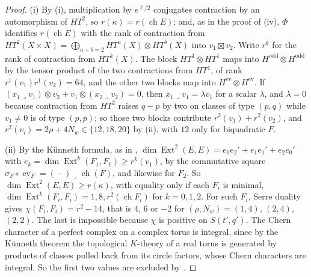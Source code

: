 \documentclass[11pt,reqno]{amsart}
\theoremstyle{plain}
\theoremstyle{definition}
\theoremstyle{remark}
\DeclareMathOperator{\ch}{ch}
\DeclareMathOperator{\Ext}{Ext}
\begin{document}
\begin{proof}
(i) By (i), multiplication by $e^{\ell/2}$ conjugates
contraction by an automorphism of $HT^{2}$, so $r(\kappa)=r(\ch E)$; and, as
in the proof of (iv), $\Phi$ identifies $r(\ch E)$ with the
rank of contraction from $HT^{2}(X\times X)=\bigoplus_{a+b=2}HT^{a}(X)\otimes
HT^{b}(X)$ into $v_{1}\boxtimes v_{2}$. Write $r^{k}$ for the rank of
contraction from $HT^{k}(X)$. The block $HT^{1}\otimes HT^{1}$ maps into
$H^{\mathrm{odd}}\otimes H^{\mathrm{odd}}$ by the tensor product of the two
contractions from $HT^{1}$, of rank $r^{1}(v_{1})r^{1}(v_{2})=64$, and the other
two blocks map into $H^{\mathrm{ev}}\otimes H^{\mathrm{ev}}$. If
$(x_{1}\lrcorner v_{1})\otimes v_{2}+v_{1}\otimes(x_{2}\lrcorner v_{2})=0$, then
$x_{1}\lrcorner v_{1}=\lambda v_{1}$ for a scalar $\lambda$, and $\lambda=0$
because contraction from $HT^{2}$ raises $q-p$ by two on classes of type
$(p,q)$ while $v_{1}\ne0$ is of type $(p,p)$; so those two blocks contribute
$r^{2}(v_{1})+r^{2}(v_{2})$, and $r^{2}(v_{i})=2\rho+4N_{w}\in\{12,18,20\}$ by
(ii), with $12$ only for biquadratic $F$.

(ii) By the K\"unneth formula, as in ,
$\dim\Ext^{2}(E,E)=e_{0}e_{2}'+e_{1}e_{1}'+e_{2}e_{0}'$ with
$e_{k}=\dim\Ext^{k}(F_{1},F_{1})\ge r^{k}(v_{1})$, by the commutative square
$\sigma_{F}\circ\operatorname{ev}_{F}=(\,\cdot\,)\lrcorner\ch(F)$, and likewise
for $F_{2}$. So $\dim\Ext^{2}(E,E)\ge r(\kappa)$, with equality only if each
$F_{i}$ is minimal, $\dim\Ext^{k}(F_{i},F_{i})=1,8,r^{2}(\ch F_{i})$ for
$k=0,1,2$. For such $F_{i}$, Serre duality gives $\chi(F_{i},F_{i})=r^{2}-14$,
that is $4$, $6$ or $-2$ for $(\rho,N_{w})=(1,4)$, $(2,4)$, $(2,2)$. The last
is impossible because $\chi$ is positive on $S(t',q')$. The Chern character
of a perfect complex on a complex torus is integral, since by the K\"unneth
theorem the topological $K$-theory of a real torus is generated by products of
classes pulled back from its circle factors, whose Chern characters are
integral. So the first two values are excluded by .


\end{proof}
\end{document}
